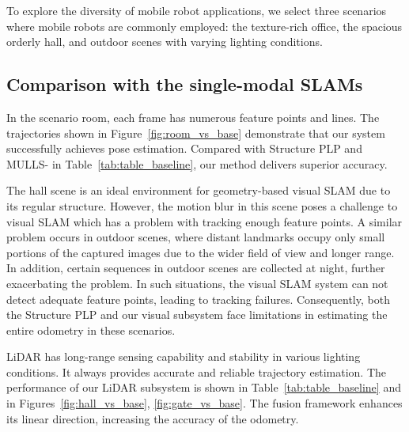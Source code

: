 To explore the diversity of mobile robot applications, we select three scenarios where mobile robots are commonly employed: the texture-rich office, the spacious orderly hall, and outdoor scenes with varying lighting conditions. 

\subsection{Comparison with the single-modal SLAMs} 

In the scenario room, each frame has numerous feature points and lines. The trajectories shown in Figure~\ref{fig:room_vs_base} demonstrate that our system successfully achieves pose estimation. Compared with Structure PLP and MULLS- in Table~\ref{tab:table_baseline}, our method delivers superior accuracy.

The hall scene is an ideal environment for geometry-based visual SLAM due to its regular structure. However, the motion blur in this scene poses a challenge to visual SLAM which has a problem with tracking enough feature points. A similar problem occurs in outdoor scenes, where distant landmarks occupy only small portions of the captured images due to the wider field of view and longer range. In addition, certain sequences in outdoor scenes are collected at night, further exacerbating the problem. In such situations, the visual SLAM system can not detect adequate feature points, leading to tracking failures. Consequently, both the Structure PLP and our visual subsystem face limitations in estimating the entire odometry in these scenarios.

LiDAR has long-range sensing capability and stability in various lighting conditions. It always provides accurate and reliable trajectory estimation. The performance of our LiDAR subsystem is shown in Table~\ref{tab:table_baseline} and in Figures~\ref{fig:hall_vs_base}, \ref{fig:gate_vs_base}. The fusion framework enhances its linear direction, increasing the accuracy of the odometry.

